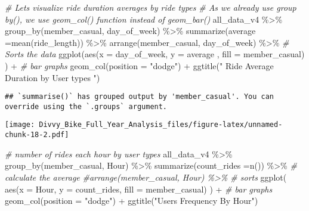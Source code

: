 \documentclass[
]{article}
\newenvironment{Shaded}{\begin{snugshade}}{\end{snugshade}}
\newcommand{\AttributeTok}[1]{\textcolor[rgb]{0.77,0.63,0.00}{#1}}
\newcommand{\CommentTok}[1]{\textcolor[rgb]{0.56,0.35,0.01}{\textit{#1}}}
\newcommand{\FunctionTok}[1]{\textcolor[rgb]{0.00,0.00,0.00}{#1}}
\newcommand{\NormalTok}[1]{#1}
\newcommand{\SpecialCharTok}[1]{\textcolor[rgb]{0.00,0.00,0.00}{#1}}
\newcommand{\StringTok}[1]{\textcolor[rgb]{0.31,0.60,0.02}{#1}}
\begin{document}
\begin{Shaded}
\begin{Highlighting}[]
\CommentTok{\# Let\textquotesingle{}s visualize ride duration averages by ride types}
\CommentTok{\# As we already use group by(), we use  geom\_col() function instead of  geom\_bar()}
\NormalTok{   all\_data\_v4 }\SpecialCharTok{\%\textgreater{}\%}
      \FunctionTok{group\_by}\NormalTok{(member\_casual, day\_of\_week) }\SpecialCharTok{\%\textgreater{}\%}
      \FunctionTok{summarize}\NormalTok{(}\AttributeTok{average =}\FunctionTok{mean}\NormalTok{(ride\_length)) }\SpecialCharTok{\%\textgreater{}\%}  
      \FunctionTok{arrange}\NormalTok{(member\_casual, day\_of\_week) }\SpecialCharTok{\%\textgreater{}\%}                 \CommentTok{\# Sorts the data}
      \FunctionTok{ggplot}\NormalTok{(}\FunctionTok{aes}\NormalTok{(}\AttributeTok{x =}\NormalTok{ day\_of\_week, }\AttributeTok{y =}\NormalTok{ average , }\AttributeTok{fill =}\NormalTok{ member\_casual) ) }\SpecialCharTok{+}   \CommentTok{\# bar graphs}
              \FunctionTok{geom\_col}\NormalTok{(}\AttributeTok{position =} \StringTok{"dodge"}\NormalTok{) }\SpecialCharTok{+} \FunctionTok{ggtitle}\NormalTok{(}\StringTok{" Ride Average Duration by User types "}\NormalTok{)}
\end{Highlighting}
\end{Shaded}

\begin{verbatim}
## `summarise()` has grouped output by 'member_casual'. You can override using the `.groups` argument.
\end{verbatim}

\texttt{[image: Divvy\_Bike\_Full\_Year\_Analysis\_files/figure-latex/unnamed-chunk-18-2.pdf]}

\begin{Shaded}
\begin{Highlighting}[]
\CommentTok{\# number of rides each hour by user types}
\NormalTok{   all\_data\_v4 }\SpecialCharTok{\%\textgreater{}\%}
      \FunctionTok{group\_by}\NormalTok{(member\_casual, Hour) }\SpecialCharTok{\%\textgreater{}\%}
      \FunctionTok{summarize}\NormalTok{(}\AttributeTok{count\_rides =}\FunctionTok{n}\NormalTok{()) }\SpecialCharTok{\%\textgreater{}\%} \CommentTok{\# calculate the average}
      \CommentTok{\#arrange(member\_casual, Hour) \%\textgreater{}\%                     \# sorts}
      \FunctionTok{ggplot}\NormalTok{( }\FunctionTok{aes}\NormalTok{(}\AttributeTok{x =}\NormalTok{ Hour, }\AttributeTok{y =}\NormalTok{ count\_rides, }\AttributeTok{fill =}\NormalTok{ member\_casual) ) }\SpecialCharTok{+} \CommentTok{\# bar graphs}
      \FunctionTok{geom\_col}\NormalTok{(}\AttributeTok{position =} \StringTok{"dodge"}\NormalTok{)  }\SpecialCharTok{+} \FunctionTok{ggtitle}\NormalTok{(}\StringTok{"Users Frequency By Hour"}\NormalTok{)}
\end{Highlighting}
\end{Shaded}
\end{document}
